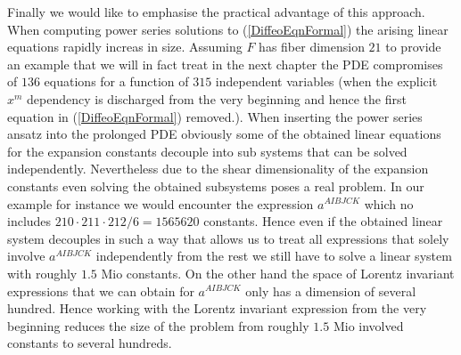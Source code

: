 \documentclass[a4paper,12pt, DIV=14, BCOR=5mm, twoside, headsepline, numbers=noenddot]{scrbook}
\begin{document}
Finally we would like to emphasise the practical advantage of this approach. When computing power series solutions to (\ref{DiffeoEqnFormal}) the arising linear equations rapidly increas in size. Assuming $F$ has fiber dimension $21$ to provide an example that we will in fact treat in the next chapter the PDE compromises of $136$ equations for a function of $315$ independent variables (when the explicit $x^m$ dependency is discharged from the very beginning and hence the first equation in (\ref{DiffeoEqnFormal}) removed.).  When inserting the power series ansatz into the prolonged PDE obviously some of the obtained linear equations for the expansion constants decouple into sub systems that can be solved independently. Nevertheless due to the shear dimensionality of the expansion constants even solving the obtained subsystems poses a real problem. In our example for instance we would encounter the expression $a^{AIBJCK}$ which no includes $210\cdot 211\cdot212/6=1565620$ constants. Hence even if the obtained linear system decouples in such a way that allows us to treat all expressions that solely involve $a^{AIBJCK}$ independently from the rest we still have to solve a linear system with roughly $1.5$ Mio constants. On the other hand the space of Lorentz invariant expressions that we can obtain for $a^{AIBJCK}$ only has a dimension of several hundred. Hence working with the Lorentz invariant expression from the very beginning reduces the size of the problem from roughly $1.5$ Mio involved constants to several hundreds. 
\end{document}
